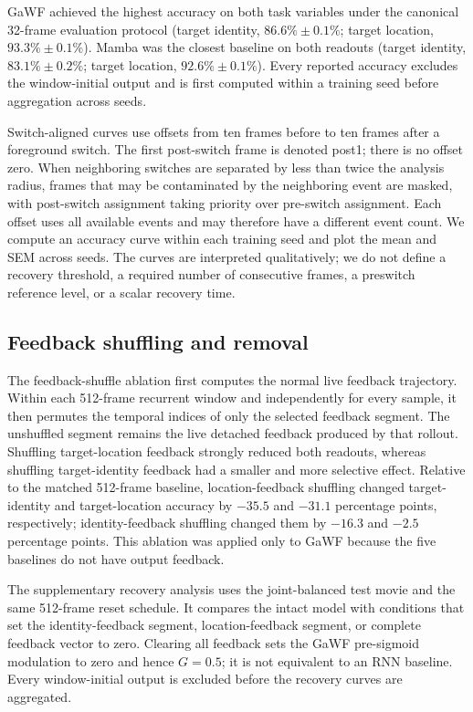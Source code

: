 GaWF achieved the highest accuracy on both task variables under the canonical 32-frame evaluation protocol (target identity, \(86.6\%\pm0.1\%\); target location, \(93.3\%\pm0.1\%\)). Mamba was the closest baseline on both readouts (target identity, \(83.1\%\pm0.2\%\); target location, \(92.6\%\pm0.1\%\)). Every reported accuracy excludes the window-initial output and is first computed within a training seed before aggregation across seeds.

Switch-aligned curves use offsets from ten frames before to ten frames after a foreground switch. The first post-switch frame is denoted post1; there is no offset zero. When neighboring switches are separated by less than twice the analysis radius, frames that may be contaminated by the neighboring event are masked, with post-switch assignment taking priority over pre-switch assignment. Each offset uses all available events and may therefore have a different event count. We compute an accuracy curve within each training seed and plot the mean and SEM across seeds. The curves are interpreted qualitatively; we do not define a recovery threshold, a required number of consecutive frames, a preswitch reference level, or a scalar recovery time.

\subsection{Feedback shuffling and removal}

The feedback-shuffle ablation first computes the normal live feedback trajectory. Within each 512-frame recurrent window and independently for every sample, it then permutes the temporal indices of only the selected feedback segment. The unshuffled segment remains the live detached feedback produced by that rollout. Shuffling target-location feedback strongly reduced both readouts, whereas shuffling target-identity feedback had a smaller and more selective effect. Relative to the matched 512-frame baseline, location-feedback shuffling changed target-identity and target-location accuracy by \(-35.5\) and \(-31.1\) percentage points, respectively; identity-feedback shuffling changed them by \(-16.3\) and \(-2.5\) percentage points. This ablation was applied only to GaWF because the five baselines do not have output feedback.

The supplementary recovery analysis uses the joint-balanced test movie and the same 512-frame reset schedule. It compares the intact model with conditions that set the identity-feedback segment, location-feedback segment, or complete feedback vector to zero. Clearing all feedback sets the GaWF pre-sigmoid modulation to zero and hence \(G=0.5\); it is not equivalent to an RNN baseline. Every window-initial output is excluded before the recovery curves are aggregated.

